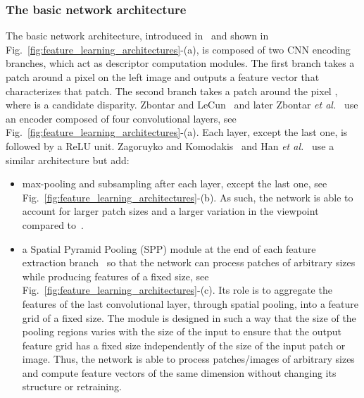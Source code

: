 \documentclass[10pt,journal,compsoc]{IEEEtran}
\newcommand{\etal}{\emph{et al.}}
\begin{document}
\subsubsection{The basic network architecture}
\label{sec:baseline_architecture}
The basic network architecture, introduced in~\cite{zagoruyko2015learning,han2015matchnet,zbontar2015computing,zbontar2016stereo} and shown in Fig.~\ref{fig:feature_learning_architectures}-(a), is composed of two CNN encoding branches,  which act as descriptor computation modules.  The first branch takes a patch around a pixel  on the left image and outputs  a feature vector that characterizes that patch. The second branch takes a patch around the pixel , where  is a candidate disparity.  Zbontar and LeCun~\cite{zbontar2015computing} and later Zbontar \etal~\cite{zbontar2016stereo} use an encoder composed of four convolutional layers, see Fig.~\ref{fig:feature_learning_architectures}-(a). Each layer, except the last one, is followed by a ReLU unit. Zagoruyko and Komodakis~\cite{zagoruyko2015learning} and Han \etal~\cite{han2015matchnet} use a similar architecture but add:
\begin{itemize}
	\item max-pooling and subsampling after each layer, except the last one, see Fig.~\ref{fig:feature_learning_architectures}-(b). As such, the network is able to account for larger patch sizes and a larger variation in the viewpoint  compared to~\cite{zbontar2015computing,zbontar2016stereo}.
	
	\item a Spatial Pyramid Pooling (SPP) module at the end of each feature extraction branch~\cite{zagoruyko2015learning} so that the network can process patches of arbitrary sizes  while producing features of a fixed size, see Fig.~\ref{fig:feature_learning_architectures}-(c). Its role is to aggregate the features of the last convolutional layer, through spatial pooling, into a feature grid of a fixed size. The module is designed in such a way that the size of the pooling regions varies with the size of the input to ensure that the output feature grid has a fixed size independently of the size of the input patch or image.  Thus, the network is able to process patches/images of arbitrary sizes and compute feature vectors of the same dimension without changing its structure or retraining. 
\end{itemize}
\end{document}
